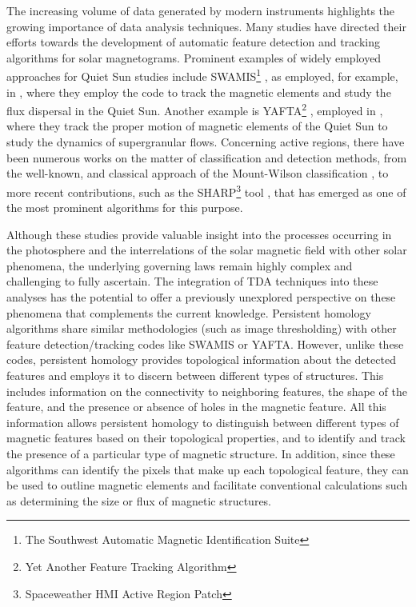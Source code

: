 The increasing volume of data generated by modern instruments highlights the growing importance of data analysis techniques. Many studies have directed their efforts towards the development of automatic feature detection and tracking algorithms for solar magnetograms. Prominent examples of widely employed approaches for Quiet Sun studies include SWAMIS\footnote{The Southwest Automatic Magnetic Identification Suite} \citep{swamis_yafta}, as employed, for example, in \cite{swamis_example}, where they employ the code to track the magnetic elements and study the flux dispersal in the Quiet Sun. Another example is YAFTA\footnote{Yet Another Feature Tracking Algorithm} \citep{yafta}, employed in \cite{yafta_example},  where they track the proper motion of magnetic elements of the Quiet Sun to study the dynamics of supergranular flows. Concerning active regions, there have been numerous works on the matter of classification and detection methods, from the well-known, and classical approach of the Mount-Wilson classification \citep{hale}, to more recent contributions, such as the SHARP\footnote{Spaceweather HMI Active Region Patch} tool \citep{sharp}, that has emerged as one of the most prominent algorithms for this purpose.

Although these studies provide valuable insight into the processes occurring in the photosphere and the interrelations of the solar magnetic field with other solar phenomena, the underlying governing laws remain highly complex and challenging to fully ascertain. The integration of TDA techniques into these analyses has the potential to offer a previously unexplored perspective on these phenomena that complements the current knowledge. Persistent homology algorithms share similar methodologies (such as image thresholding) with other feature detection/tracking codes like SWAMIS or YAFTA. However, unlike these codes, persistent homology provides topological information about the detected features and employs it to discern between different types of structures. This includes information on the connectivity to neighboring features, the shape of the feature, and the presence or absence of holes in the magnetic feature. All this information allows persistent homology to distinguish between different types of magnetic features based on their topological properties, and to identify and track the presence of a particular type of magnetic structure. In addition, since these algorithms can identify the pixels that make up each topological feature, they can be used to outline magnetic elements and facilitate conventional calculations such as determining the size or flux of magnetic structures.

